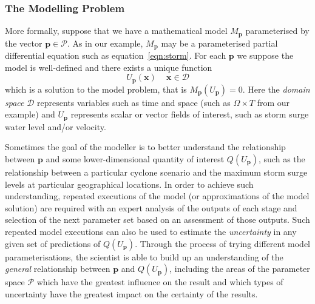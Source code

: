 \subsubsection*{The Modelling Problem}

More formally, suppose that we have a mathematical model
$M_{\mathbf{p}}$ parameterised by the vector
$\mathbf{p}\in\mathcal{P}$. As in our example, $M_{\mathbf{p}}$ may be a
parameterised partial differential equation such as equation~\eqref{eqn:storm}.
For each $\mathbf{p}$ we suppose the model is
well-defined and there exists a unique function
\begin{equation}
  \label{eq:1}
  U_{\mathbf{p}}(\mathbf{x})\, \quad \mathbf{x}\in\mathcal{D}
\end{equation}
which is a solution to the model problem, that is $M_{\mathbf{p}}(U_{\mathbf{p}})=0$.
Here the \emph{domain space} $\mathcal{D}$ represents variables such as 
time and space (such as $\Omega \times T$ from our example) 
and $U_{\mathbf{p}}$ represents scalar or vector fields of interest, 
such as storm surge water level and/or velocity. 

Sometimes the goal of the modeller is to better understand the
relationship between $\mathbf{p}$ and some lower-dimensional quantity
of interest $Q(U_{\mathbf{p}})$, such as the relationship between a
particular cyclone scenario and the maximum storm surge levels at
particular geographical locations. In order to achieve such
understanding, repeated executions of the model (or approximations of the model solution) are required
with an expert analysis of the outputs of each stage and selection of
the next parameter set based on an assessment of those outputs. Such
repeated model executions can also be used to estimate the
\emph{uncertainty} in any given set of predictions of
$Q(U_{\mathbf{p}})$. Through the process of trying different model
parameterisations, the scientist is able to build up an understanding
of the \emph{general} relationship between $\mathbf{p}$ and
$Q(U_{\mathbf{p}})$, including the areas of the parameter space
$\mathcal{P}$ which have the greatest influence on the result and
which types of uncertainty have the greatest impact on the certainty
of the results.







